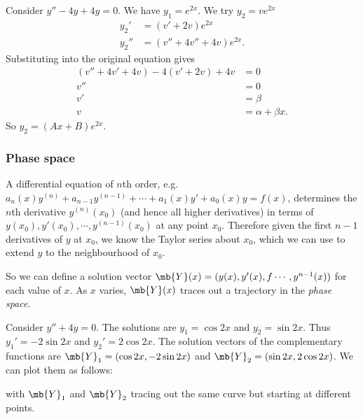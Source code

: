 \documentclass[a4paper]{article}
\begin{document}
\begin{eg}
  Consider $y'' - 4y + 4y = 0$. We have $y_1 = e^{2x}$. We try $y_2 = ve^{2x}$
  \begin{align*}
    y_2' &= (v' + 2v)e^{2x}\\
    y_2'' &= (v'' + 4v'' + 4v)e^{2x}.
  \end{align*}
  Substituting into the original equation gives
  \begin{align*}
    (v'' + 4v' + 4v) - 4(v' + 2v) + 4v &= 0\\
    v'' &= 0\\
    v' &= \beta\\
    v &= \alpha + \beta x.
  \end{align*}
 So $y_2 = (Ax + B)e^{2x}$.
\end{eg}

\subsubsection{Phase space}
A differential equation of $n$th order, e.g. $a_n(x) y^{(n)} + a_{n - 1}y^{(n - 1)} + \cdots + a_1(x) y' + a_0 (x) y = f(x)$, determines the $n$th derivative $y^{(n)} (x_0)$ (and hence all higher derivatives) in terms of $y(x_0), y'(x_0), \cdots ,y^{(n - 1)}(x_0)$ at any point $x_0$. Therefore given the first $n - 1$ derivatives of $y$ at $x_0$, we know the Taylor series about $x_0$, which we can use to extend $y$ to the neighbourhood of $x_0$.

So we can define a solution vector $\mb{Y}(x) = (y(x), y'(x),f \cdots , y^{n - 1}(x))$ for each value of $x$. As $x$ varies, $\mb{Y}(x)$ traces out a trajectory in the \emph{phase space}.

\begin{eg}
  Consider $y'' + 4y = 0$. The solutions are $y_1 = \cos 2x$ and $y_2 = \sin 2x$. Thus $y_1' = -2\sin 2x$ and $y_2' = 2\cos 2x$. The solution vectors of the complementary functions are $\mb{Y}_1 = (\cos 2x, -2\sin 2x)$ and $\mb{Y}_2 = (\sin 2x, 2\cos 2x)$. We can plot them as follows:

  \begin{center}
  \end{center}

  \noindent with $\mb{Y}_1$ and $\mb{Y}_2$ tracing out the same curve but starting at different points.
\end{eg}
\end{document}
